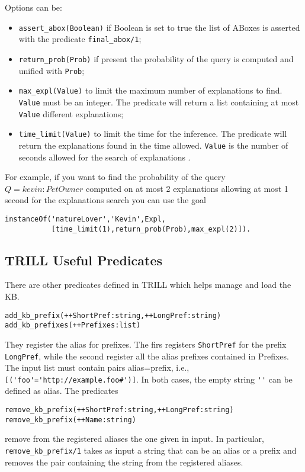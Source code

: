 Options can be:
\begin{itemize}
	\item \verb|assert_abox(Boolean)| if Boolean is set to true the list of ABoxes is asserted with the predicate \verb|final_abox/1|;
	\item \verb|return_prob(Prob)| if present the probability of the query is computed and unified with \verb|Prob|;
	\item \verb|max_expl(Value)| to limit the maximum number of explanations to find. \verb|Value| must be an integer. The predicate will return a list containing at most \verb|Value| different explanations;
	\item \verb|time_limit(Value)| to limit the time for the inference. The predicate will return the explanations found in the time allowed. \verb|Value| is the number of seconds allowed for the search of explanations .
\end{itemize}

For example, if you want to find the probability of the query $Q=kevin:PetOwner$ computed on at most 2 explanations allowing at most 1 second for the explanations search you can use the goal
\begin{verbatim}
instanceOf('natureLover','Kevin',Expl,
           [time_limit(1),return_prob(Prob),max_expl(2)]).
\end{verbatim}

\subsection{TRILL Useful Predicates}
There are other predicates defined in TRILL which helps manage and load the KB.
\begin{verbatim}
add_kb_prefix(++ShortPref:string,++LongPref:string)
add_kb_prefixes(++Prefixes:list)
\end{verbatim}
They register the alias for prefixes. The firs registers \verb|ShortPref| for the prefix \verb|LongPref|, while the second register all the alias prefixes contained in Prefixes. The input list must contain pairs alias=prefix, i.e., \verb|[('foo'='http://example.foo#')]|. In both cases, the empty string \verb|''| can be defined as alias. The predicates
\begin{verbatim}
remove_kb_prefix(++ShortPref:string,++LongPref:string)
remove_kb_prefix(++Name:string)
\end{verbatim}
remove from the registered aliases the one given in input. In particular, \verb|remove_kb_prefix/1| takes as input a string that can be an alias or a prefix and removes the pair containing the string from the registered aliases.


